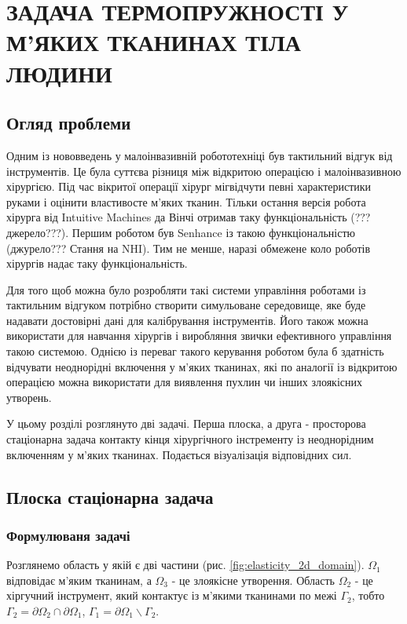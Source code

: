 \chapter{ЗАДАЧА ТЕРМОПРУЖНОСТІ У М'ЯКИХ ТКАНИНАХ ТІЛА ЛЮДИНИ}

\nocite{bahvalov-et-al,benerdge-et-al} 

\section{Огляд проблеми}

Одним із нововведень у малоінвазивній робототехніці був тактильний відгук від інструментів. Це була суттєва різниця між
відкритою операцією і малоінвазивною хірургією. Під час вікритої операції хірург міг відчути певні
характеристики руками і оцінити властивосте м'яких тканин. Тільки остання версія робота хірурга від Intuitive Machines
да Вінчі отримав таку функціональність (???джерело???). Першим роботом був Senhance із такою функціональністю
(джурело??? Стання на NHI). Тим не менше, наразі обмежене коло роботів хірургів надає таку функціональність.

Для того щоб можна було розробляти такі системи управління роботами із тактильним відгуком потрібно створити симульоване 
середовище, яке буде надавати достовірні дані для калібрування інструментів. Його також можна використати для навчання
хірургів і виробляння звички ефективного управління такою системою. Однією із переваг такого керування роботом була б 
здатність відчувати неоднорідні включення у м'яких тканинах, які по аналогії із відкритою операцією можна використати 
для виявлення пухлин чи інших злоякісних утворень.

У цьому розділі розглянуто дві задачі. Перша плоска, а друга - просторова стаціонарна задача контакту кінця хірургічного 
інстременту із неоднорідним включенням у м'яких тканинах. Подається візуалізація відповідних сил.

\section{Плоска стаціонарна задача}

\subsection{Формулюваня задачі}

Розглянемо область у якій є дві частини (рис. \ref{fig:elasticity_2d_domain}). $\Omega_1$ відповідає м'яким тканинам, а
$\Omega_3$ - це злоякісне утворення. Область $\Omega_2$ - це хіргучний інструмент, який контактує із м'якими тканинами
по межі $\Gamma_2$, тобто $\Gamma_2=\partial\Omega_2 \cap \partial\Omega_1$, 
$\Gamma_1 = \partial \Omega_1 \backslash \Gamma_2$.

